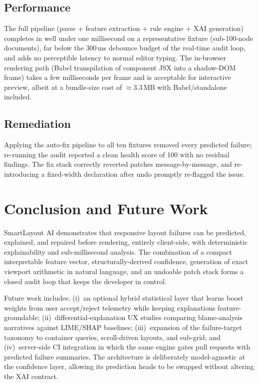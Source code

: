 \documentclass[conference]{IEEEtran}
\begin{document}
\subsection{Performance}
The full pipeline (parse + feature extraction + rule engine + XAI
generation) completes in well under one millisecond on a representative
fixture (sub-100-node documents), far below the 300\,ms debounce budget
of the real-time audit loop, and adds no perceptible latency to normal
editor typing. The in-browser rendering path (Babel transpilation of
component JSX into a shadow-DOM frame) takes a few milliseconds per
frame and is acceptable for interactive preview, albeit at a bundle-size
cost of $\approx$3.3\,MB with Babel/standalone included.

\subsection{Remediation}
Applying the auto-fix pipeline to all ten fixtures removed every
predicted failure; re-running the audit reported a clean health score of
100 with no residual findings. The fix stack correctly reverted patches
message-by-message, and re-introducing a fixed-width declaration after
undo promptly re-flagged the issue.

\section{Conclusion and Future Work}

SmartLayout AI demonstrates that responsive layout failures can be
predicted, explained, and repaired before rendering, entirely
client-side, with deterministic explainability and sub-millisecond
analysis. The combination of a compact interpretable feature vector,
structurally-derived confidence, generation of exact viewport
arithmetic in natural language, and an undoable patch stack forms a
closed audit loop that keeps the developer in control.

Future work includes: (i)~an optional hybrid statistical layer that
learns boost weights from user accept/reject telemetry while keeping
explanations feature-groundable; (ii)~differential-explanation UX
studies comparing blame-analysis narratives against LIME/SHAP baselines;
(iii)~expansion of the failure-target taxonomy to container queries,
scroll-driven layouts, and sub-grid; and (iv)~server-side CI integration
in which the same engine gates pull requests with predicted failure
summaries. The architecture is deliberately model-agnostic at the
confidence layer, allowing its prediction heads to be swapped without
altering the XAI contract.
\end{document}
